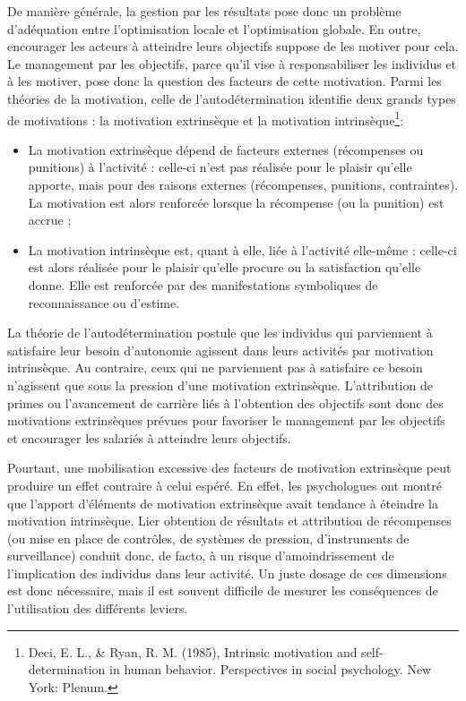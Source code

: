 \documentclass[oneside]{kaobook}
\begin{document}
De manière générale, la gestion par les résultats pose donc un problème d’adéquation entre l’optimisation locale et l’optimisation globale. En outre, encourager les acteurs à atteindre leurs objectifs suppose de les motiver pour cela. Le management par les objectifs, parce qu’il vise à responsabiliser les individus et à les motiver, pose donc la question des facteurs de cette motivation. Parmi les théories de la motivation, celle de l’autodétermination identifie deux grands types de motivations : la motivation extrinsèque et la motivation intrinsèque\footnote{Deci, E. L., \& Ryan, R. M. (1985), Intrinsic motivation and self-determination in human behavior. Perspectives in social psychology. New York: Plenum.}:
\begin{itemize}
\item La motivation extrinsèque dépend de facteurs externes (récompenses ou punitions) à l’activité : celle-ci n’est pas réalisée pour le plaisir qu’elle apporte, mais pour des raisons externes (récompenses, punitions, contraintes). La motivation est alors renforcée lorsque la récompense (ou la punition) est accrue ;
\item La motivation intrinsèque est, quant à elle, liée à l’activité elle-même : celle-ci est alors réalisée pour le plaisir qu’elle procure ou la satisfaction qu’elle donne. Elle est renforcée par des manifestations symboliques de reconnaissance ou d’estime.
\end{itemize}

La théorie de l’autodétermination postule que les individus qui parviennent à satisfaire leur besoin d’autonomie agissent dans leurs activités par motivation intrinsèque. Au contraire, ceux qui ne parviennent pas à satisfaire ce besoin n’agissent que sous la pression d’une motivation extrinsèque. L’attribution de primes ou l’avancement de carrière liés à l’obtention des objectifs sont donc des motivations extrinsèques prévues pour favoriser le management par les objectifs et encourager les salariés à atteindre leurs objectifs.

Pourtant, une mobilisation excessive des facteurs de motivation extrinsèque peut produire un effet contraire à celui espéré. En effet, les psychologues ont montré que l’apport d’éléments de motivation extrinsèque avait tendance à éteindre la motivation intrinsèque. Lier obtention de résultats et attribution de récompenses (ou mise en place de contrôles, de systèmes de pression, d’instruments de surveillance) conduit donc, de facto, à un risque d’amoindrissement de l’implication des individus dans leur activité. Un juste dosage de ces dimensions est donc nécessaire, mais il est souvent difficile de mesurer les conséquences de l’utilisation des différents leviers.
\end{document}

